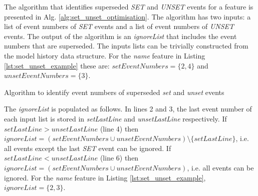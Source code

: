 \documentclass[12pt, a4paper]{report} \usepackage[titletoc]{appendix}
\begin{document}
The algorithm that identifies superseded \emph{SET} and \emph{UNSET} events for a feature is presented in Alg. \ref{alg:set_unset_optimisation}. The algorithm has two inputs: a list of event numbers of \emph{SET} events and a list of event numbers of \emph{UNSET} events. The output of the algorithm is an \emph{ignoreList} that includes the event numbers that are superseded. The inputs lists can be trivially constructed from the model history data structure. For the \emph{name} feature in Listing \ref{lst:set_unset_example} these are: $setEventNumbers = \{2,4\}$ and $unsetEventNumbers = \{3\}$.

\begin{algorithm}[H]
	\begin{small}
	\end{small}
	\caption{Algorithm to identify event numbers of superseded \emph{set} and \emph{unset} events}
	\label{alg:set_unset_optimisation}
\end{algorithm}

The \emph{ignoreList} is populated as follows.
In lines 2 and 3, the last event number of each input list is stored in \emph{setLastLine} and \emph{unsetLastLine} respectively. If $setLastLine > unsetLastLine$ (line 4) then $ignoreList = (setEventNumbers \cup unsetEventNumbers) \setminus  \{setLastLine\} $, i.e. all events except the last \emph{SET} event can be ignored. If $setLastLine < unsetLastLine$ (line 6) then $ignoreList = (setEventNumbers \cup unsetEventNumbers)$, i.e. all events can be ignored. For the \emph{name} feature in Listing \ref{lst:set_unset_example}, $ignoreList = \{2, 3\}$.
\end{document}
